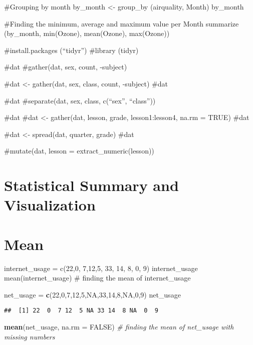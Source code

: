 \documentclass[
]{article}
\newenvironment{Shaded}{\begin{snugshade}}{\end{snugshade}}
\newcommand{\AttributeTok}[1]{\textcolor[rgb]{0.13,0.29,0.53}{#1}}
\newcommand{\CommentTok}[1]{\textcolor[rgb]{0.56,0.35,0.01}{\textit{#1}}}
\newcommand{\ConstantTok}[1]{\textcolor[rgb]{0.56,0.35,0.01}{#1}}
\newcommand{\DecValTok}[1]{\textcolor[rgb]{0.00,0.00,0.81}{#1}}
\newcommand{\FunctionTok}[1]{\textcolor[rgb]{0.13,0.29,0.53}{\textbf{#1}}}
\newcommand{\NormalTok}[1]{#1}
\newcommand{\OtherTok}[1]{\textcolor[rgb]{0.56,0.35,0.01}{#1}}
\begin{document}
\#Grouping by month by\_month \textless- group\_by (airquality, Month)
by\_month

\#Finding the minimum, average and maximum value per Month summarize
(by\_month, min(Ozone), mean(Ozone), max(Ozone))

\#install.packages (``tidyr'') \#library (tidyr)

\#dat \#gather(dat, sex, count, -subject)

\#dat \textless- gather(dat, sex, class, count, -subject) \#dat

\#dat \#separate(dat, sex, class, c(``sex'', ``class''))

\#dat \#dat \textless- gather(dat, lesson, grade, lesson1:lesson4, na.rm
= TRUE) \#dat

\#dat \textless- spread(dat, quarter, grade) \#dat

\#mutate(dat, lesson = extract\_numeric(lesson))

\section{Statistical Summary and
Visualization}\label{statistical-summary-and-visualization}

\section{Mean}\label{mean}

internet\_usage = c(22,0, 7,12,5, 33, 14, 8, 0, 9) internet\_usage
mean(internet\_usage) \# finding the mean of internet\_usage

\begin{Shaded}
\begin{Highlighting}[]
\NormalTok{net\_usage }\OtherTok{=} \FunctionTok{c}\NormalTok{(}\DecValTok{22}\NormalTok{,}\DecValTok{0}\NormalTok{,}\DecValTok{7}\NormalTok{,}\DecValTok{12}\NormalTok{,}\DecValTok{5}\NormalTok{,}\ConstantTok{NA}\NormalTok{,}\DecValTok{33}\NormalTok{,}\DecValTok{14}\NormalTok{,}\DecValTok{8}\NormalTok{,}\ConstantTok{NA}\NormalTok{,}\DecValTok{0}\NormalTok{,}\DecValTok{9}\NormalTok{)}
\NormalTok{net\_usage}
\end{Highlighting}
\end{Shaded}

\begin{verbatim}
##  [1] 22  0  7 12  5 NA 33 14  8 NA  0  9
\end{verbatim}

\begin{Shaded}
\begin{Highlighting}[]
\FunctionTok{mean}\NormalTok{(net\_usage, }\AttributeTok{na.rm =} \ConstantTok{FALSE}\NormalTok{) }\CommentTok{\# finding the mean of net\_usage with missing numbers }
\end{Highlighting}
\end{Shaded}
\end{document}
